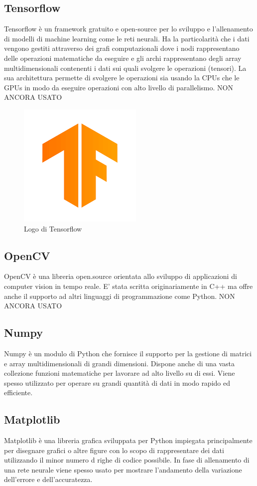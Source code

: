 \subsection{Tensorflow}
Tensorflow è un framework gratuito e open-source per lo sviluppo e l'allenamento di modelli di machine learning come le reti neurali. Ha la particolarità che i dati vengono gestiti attraverso dei grafi computazionali dove i nodi rappresentano delle operazioni matematiche da eseguire e gli archi rappresentano degli array multidimensionali contenenti i dati sui quali svolgere le operazioni (tensori). La sua architettura permette di svolgere le operazioni sia usando la CPUs che le GPUs in modo da eseguire operazioni con alto livello di parallelismo. NON ANCORA USATO
\begin{figure}[H]
	\centering
	\includegraphics[width=0.3\linewidth]{images/logo-tensorflow.png}
	\caption{Logo di Tensorflow}
	\label{Logo di Tensorflow}
\end{figure}
\subsection{OpenCV}
OpenCV è una libreria open.source orientata allo sviluppo di applicazioni di computer vision in tempo reale. E' stata scritta originariamente in C++ ma offre anche il supporto ad altri linguaggi di programmazione come Python. NON ANCORA USATO
\subsection{Numpy}
Numpy è un modulo di Python che fornisce il supporto per
la gestione di matrici e array multidimensionali di grandi dimensioni. Dispone anche di una vasta collezione funzioni matematiche per lavorare ad alto livello su di essi. Viene spesso utilizzato per operare su grandi quantità di dati in modo rapido ed efficiente.
\subsection{Matplotlib}
Matplotlib è una libreria grafica sviluppata per Python impiegata principalmente per disegnare grafici o altre figure con lo scopo di rappresentare dei dati utilizzando il minor numero d righe di codice possibile. In fase di allenamento di una rete neurale viene spesso usato per mostrare l'andamento della variazione dell'errore e dell'accuratezza.
